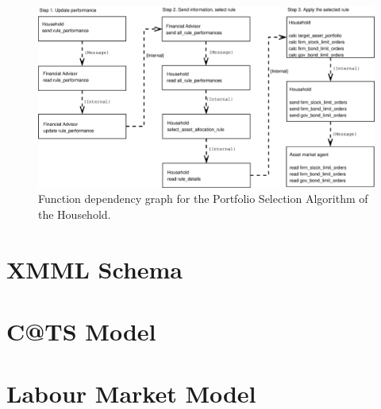 \documentclass[a4paper,11pt]{article}
\begin{document}
\begin{landscape}
\begin{figure}
\begin{center}
\includegraphics*[width = \linewidth]{Portfolio_selection_algorithm_layers.eps}
\caption{Function dependency graph for the Portfolio Selection
Algorithm of the Household.} \label{fig:p1}
\end{center}
\end{figure}


\end{landscape}

\pagebreak

\appendix
%
\section{XMML Schema}
\label{cha_xmlschema}
\small{{\tt }}

\pagebreak

\section{C@TS Model}
\label{cats_model_xmml}
\small{{\tt }}

\pagebreak

\section{Labour Market Model}
\label{labour_market_model_xmml}
\small{{\tt }}
\end{document}
